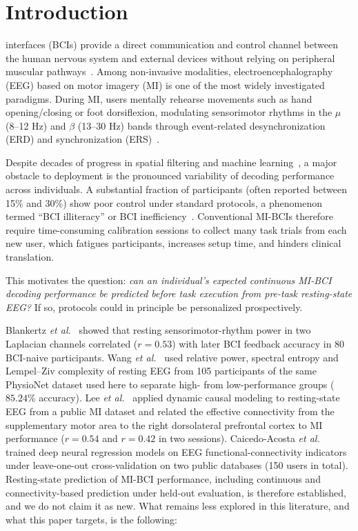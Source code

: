 \documentclass{ieeeaccess}
\begin{document}
\section{Introduction}

 interfaces (BCIs) provide a direct communication and control channel between the human nervous system and external devices without relying on peripheral muscular pathways~\cite{wolpaw2002,pfurtscheller2001}. Among non-invasive modalities, electroencephalography (EEG) based on motor imagery (MI) is one of the most widely investigated paradigms. During MI, users mentally rehearse movements such as hand opening/closing or foot dorsiflexion, modulating sensorimotor rhythms in the $\mu$ (8--12 Hz) and $\beta$ (13--30 Hz) bands through event-related desynchronization (ERD) and synchronization (ERS)~\cite{pfurtscheller2001,blankertz2008}.

Despite decades of progress in spatial filtering and machine learning~\cite{lotte2018,ang2012,ramoser2000}, a major obstacle to deployment is the pronounced variability of decoding performance across individuals. A substantial fraction of participants (often reported between 15\% and 30\%) show poor control under standard protocols, a phenomenon termed ``BCI illiteracy'' or BCI inefficiency~\cite{blankertz2010,jeunet2016,singh2021}. Conventional MI-BCIs therefore require time-consuming calibration sessions to collect many task trials from each new user, which fatigues participants, increases setup time, and hinders clinical translation.

This motivates the question: \textit{can an individual's expected continuous MI-BCI decoding performance be predicted before task execution from pre-task resting-state EEG?} If so, protocols could in principle be personalized prospectively.

Blankertz \textit{et al.}~\cite{blankertz2010} showed that resting sensorimotor-rhythm power in two Laplacian channels correlated ($r=0.53$) with later BCI feedback accuracy in 80 BCI-naive participants. Wang \textit{et al.}~\cite{wang2022} used relative power, spectral entropy and Lempel--Ziv complexity of resting EEG from 105 participants of the same PhysioNet dataset used here to separate high- from low-performance groups ($85.24\%$ accuracy). Lee \textit{et al.}~\cite{lee2020} applied dynamic causal modeling to resting-state EEG from a public MI dataset and related the effective connectivity from the supplementary motor area to the right dorsolateral prefrontal cortex to MI performance ($r=0.54$ and $r=0.42$ in two sessions). Caicedo-Acosta \textit{et al.}~\cite{caicedo2021} trained deep neural regression models on EEG functional-connectivity indicators under leave-one-out cross-validation on two public databases (150 users in total). Resting-state prediction of MI-BCI performance, including continuous and connectivity-based prediction under held-out evaluation, is therefore established, and we do not claim it as new. What remains less explored in this literature, and what this paper targets, is the following:
\end{document}
